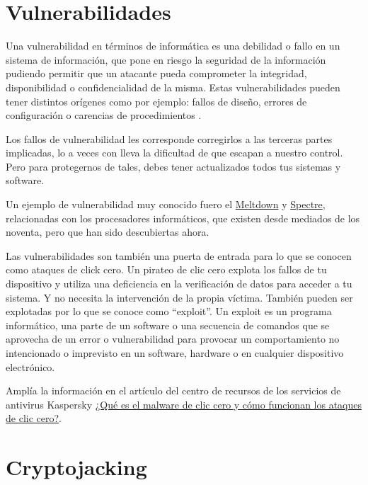 \documentclass[
  a4paper,
  openany]{book}
\begin{document}
\hypertarget{vulnerabilidades}{%
\section{Vulnerabilidades}\label{vulnerabilidades}}

Una vulnerabilidad en términos de informática es una debilidad o fallo en un sistema de información, que pone en riesgo la seguridad de la información pudiendo permitir que un atacante pueda comprometer la integridad, disponibilidad o confidencialidad de la misma. Estas vulnerabilidades pueden tener distintos orígenes como por ejemplo: fallos de diseño, errores de configuración o carencias de procedimientos \citep{INCI-vulnerabilidad}.

Los fallos de vulnerabilidad les corresponde corregirlos a las terceras partes implicadas, lo a veces con lleva la dificultad de que escapan a nuestro control. Pero para protegernos de tales, debes tener actualizados todos tus sistemas y software.

Un ejemplo de vulnerabilidad muy conocido fuero el \href{https://es.wikipedia.org/wiki/Meltdown_(vulnerabilidad)}{Meltdown} y \href{https://es.wikipedia.org/wiki/Spectre_(vulnerabilidad)}{Spectre}, relacionadas con los procesadores informáticos, que existen desde mediados de los noventa, pero que han sido descubiertas ahora.

Las vulnerabilidades son también una puerta de entrada para lo que se conocen como ataques de click cero. Un pirateo de clic cero explota los fallos de tu dispositivo y utiliza una deficiencia en la verificación de datos para acceder a tu sistema. Y no necesita la intervención de la propia víctima. También pueden ser explotadas por lo que se conoce como ``exploit''. Un exploit es un programa informático, una parte de un software o una secuencia de comandos que se aprovecha de un error o vulnerabilidad para provocar un comportamiento no intencionado o imprevisto en un software, hardware o en cualquier dispositivo electrónico.

Amplía la información en el artículo del centro de recursos de los servicios de antivirus Kaspersky \href{https://www.kaspersky.es/resource-center/definitions/what-is-zero-click-malware}{¿Qué es el malware de clic cero y cómo funcionan los ataques de clic cero?}.

\hypertarget{cryptojacking}{%
\section{Cryptojacking}\label{cryptojacking}}
\end{document}
